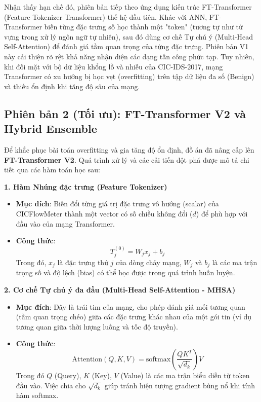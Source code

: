 \documentclass[../DoAn.tex]{subfiles}
\begin{document}
Nhận thấy hạn chế đó, phiên bản tiếp theo ứng dụng kiến trúc FT-Transformer (Feature Tokenizer Transformer) thế hệ đầu tiên. Khác với ANN, FT-Transformer biến từng đặc trưng số học thành một "token" (tương tự như từ vựng trong xử lý ngôn ngữ tự nhiên), sau đó dùng cơ chế Tự chú ý (Multi-Head Self-Attention) để đánh giá tầm quan trọng của từng đặc trưng. Phiên bản V1 này cải thiện rõ rệt khả năng nhận diện các dạng tấn công phức tạp. Tuy nhiên, khi đối mặt với bộ dữ liệu khổng lồ và nhiễu của CIC-IDS-2017, mạng Transformer có xu hướng bị học vẹt (overfitting) trên tập dữ liệu đa số (Benign) và thiếu ổn định khi tăng độ sâu của mạng.

\subsection{Phiên bản 2 (Tối ưu): FT-Transformer V2 và Hybrid Ensemble}
Để khắc phục bài toán overfitting và gia tăng độ ổn định, đồ án đã nâng cấp lên \textbf{FT-Transformer V2}. Quá trình xử lý và các cải tiến đột phá được mô tả chi tiết qua các hàm toán học sau:

\textbf{1. Hàm Nhúng đặc trưng (Feature Tokenizer)}
\begin{itemize}
    \item \textbf{Mục đích}: Biến đổi từng giá trị đặc trưng vô hướng (scalar) của CICFlowMeter thành một vector có số chiều không đổi ($d$) để phù hợp với đầu vào của mạng Transformer.
    \item \textbf{Công thức}:
    \begin{equation}
        T_j^{(0)} = W_j x_j + b_j
    \end{equation}
    Trong đó, $x_j$ là đặc trưng thứ $j$ của dòng chảy mạng, $W_j$ và $b_j$ là các ma trận trọng số và độ lệch (bias) có thể học được trong quá trình huấn luyện.
\end{itemize}

\textbf{2. Cơ chế Tự chú ý đa đầu (Multi-Head Self-Attention - MHSA)}
\begin{itemize}
    \item \textbf{Mục đích}: Đây là trái tim của mạng, cho phép đánh giá mối tương quan (tầm quan trọng chéo) giữa các đặc trưng khác nhau của một gói tin (ví dụ tương quan giữa thời lượng luồng và tốc độ truyền).
    \item \textbf{Công thức}:
    \begin{equation}
        \text{Attention}(Q, K, V) = \text{softmax}\left(\frac{Q K^T}{\sqrt{d_k}}\right) V
    \end{equation}
    Trong đó $Q$ (Query), $K$ (Key), $V$ (Value) là các ma trận biểu diễn từ token đầu vào. Việc chia cho $\sqrt{d_k}$ giúp tránh hiện tượng gradient bùng nổ khi tính hàm softmax.
\end{itemize}
\end{document}
